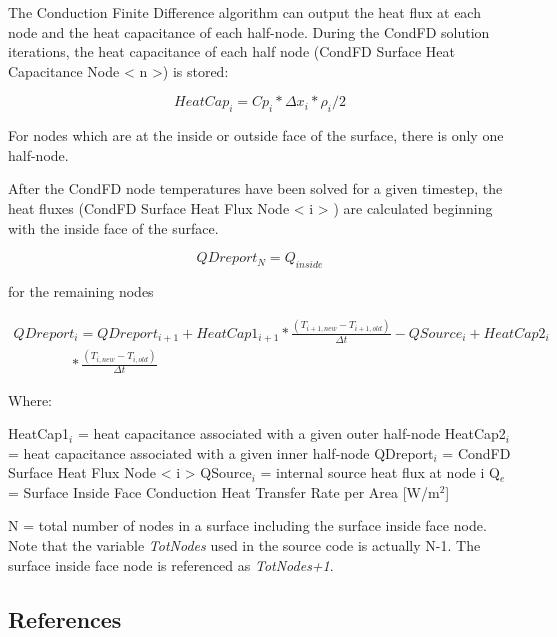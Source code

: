 The Conduction Finite Difference algorithm can output the heat flux at each node and the heat capacitance of each half-node. During the CondFD solution iterations, the heat capacitance of each half node (CondFD Surface Heat Capacitance Node \textless{} n \textgreater{}) is stored:

\begin{equation}
{HeatCap_{i} = Cp_{i}*\Delta x_{i}*\rho_{i}/2}
\end{equation}

For nodes which are at the inside or outside face of the surface, there is only one half-node.

After the CondFD node temperatures have been solved for a given timestep, the heat fluxes (CondFD Surface Heat Flux Node \textless{} i \textgreater{} ) are calculated beginning with the inside face of the surface.

\begin{equation}
{QDreport_{N} = Q_{inside}}
\end{equation}

for the remaining nodes

\begin{equation}
\begin{array}{l}
QDreport_{i} = QDreport_{i+1}+HeatCap1_{i+1}* \frac{\left(T_{i+1,new}-T_{i+1,old}\right)}{\Delta t}-QSource_{i}+HeatCap2_{i} \\
\quad \quad \quad \quad * \frac{\left(T_{i,new}-T_{i,old}\right)}{\Delta t}
\end{array}
\end{equation}

Where:

HeatCap1\(_{i}\) = heat capacitance associated with a given outer half-node HeatCap2\(_{i}\) = heat capacitance associated with a given inner half-node QDreport\(_{i}\) = CondFD Surface Heat Flux Node \textless{} i \textgreater{} QSource\(_{i}\) = internal source heat flux at node i Q\(_{e}\) = Surface Inside Face Conduction Heat Transfer Rate per Area {[}W/m\(^{2}\){]}

N = total number of nodes in a surface including the surface inside face node. Note that the variable \emph{TotNodes} used in the source code is actually N-1. The surface inside face node is referenced as \emph{TotNodes+1}.

\subsection{References}\label{references-013}

